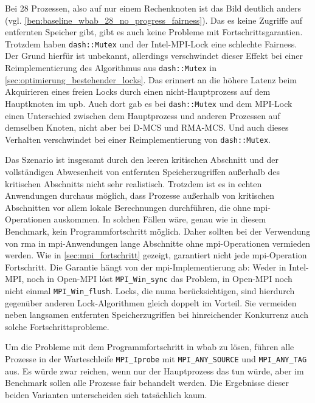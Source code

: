 Bei 28 Prozessen,
also auf nur einem Rechenknoten ist das Bild deutlich anders
(vgl. \autoref{ben:baseline_wbab_28_no_progress_fairness}).
Das es keine Zugriffe auf entfernten Speicher gibt,
gibt es auch keine Probleme mit Fortschrittsgarantien.
Trotzdem haben \texttt{dash::Mutex} und der Intel-MPI-Lock eine schlechte Fairness.
Der Grund hierfür ist unbekannt,
allerdings verschwindet dieser Effekt bei einer Reimplementierung des Algorithmus aus \texttt{dash::Mutex} in \autoref{sec:optimierung_bestehender_locks}.
Das erinnert an die höhere Latenz beim Akquirieren eines freien Locks
durch einen nicht-Hauptprozess auf dem Hauptknoten im \gls{upb}.
Auch dort gab es bei \texttt{dash::Mutex} und dem MPI-Lock einen Unterschied zwischen dem Hauptprozess
und anderen Prozessen auf demselben Knoten,
nicht aber bei D-MCS und RMA-MCS.
Und auch dieses Verhalten verschwindet bei einer Reimplementierung von \texttt{dash::Mutex}.

Das Szenario ist insgesamt durch den leeren kritischen Abschnitt
und der vollständigen Abwesenheit von entfernten Speicherzugriffen außerhalb des kritischen Abschnitts nicht sehr realistisch.
Trotzdem ist es in echten Anwendungen durchaus möglich,
dass Prozesse außerhalb von kritischen Abschnitten vor allem lokale Berechnungen durchführen,
die ohne \gls{mpi}-Operationen auskommen.
In solchen Fällen wäre,
genau wie in diesem Benchmark,
kein Programmfortschritt möglich.
Daher sollten bei der Verwendung von \gls{rma} in \gls{mpi}-Anwendungen lange Abschnitte ohne \gls{mpi}-Operationen vermieden werden.
Wie in \autoref{sec:mpi_fortschritt} gezeigt,
garantiert nicht jede \gls{mpi}-Operation Fortschritt.
Die Garantie hängt von der \gls{mpi}-Implementierung ab:
Weder in Intel-MPI,
noch in Open-MPI löst \texttt{MPI\_Win\_sync} das Problem,
in Open-MPI noch nicht einmal \texttt{MPI\_Win\_flush}.
Locks,
die \gls{numa} berücksichtigen,
sind hierdurch gegenüber anderen Lock-Algorithmen gleich doppelt im Vorteil.
Sie vermeiden neben langsamen entfernten Speicherzugriffen bei hinreichender \gls{Konkurrenz}
auch solche Fortschrittsprobleme.

Um die Probleme mit dem Programmfortschritt in \gls{wbab} zu lösen,
führen alle Prozesse in der Warteschleife \texttt{MPI\_Iprobe} mit \texttt{MPI\_ANY\_SOURCE} und \texttt{MPI\_ANY\_TAG} aus.
Es würde zwar reichen,
wenn nur der Hauptprozess das tun würde,
aber im Benchmark sollen alle Prozesse fair behandelt werden.
Die Ergebnisse dieser beiden Varianten unterscheiden sich tatsächlich kaum.

